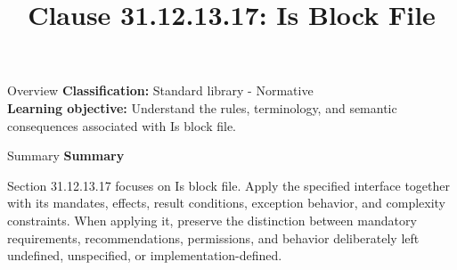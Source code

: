 \documentclass[10pt,letterpaper]{article}
\title{Clause 31.12.13.17: Is Block File}
\author{}
\date{}
\begin{document}
\maketitle
\begin{CornellOverviewBox}{Overview}
\textbf{Classification:} Standard library - Normative\\[2pt]
\textbf{Learning objective:} Understand the rules, terminology, and semantic consequences associated with Is block file.
\end{CornellOverviewBox}\begin{CornellSummaryBox}{Summary}
{\sffamily\bfseries\color{Accent} Summary}\par\vspace{3pt}Section 31.12.13.17 focuses on Is block file. Apply the specified interface together with its mandates, effects, result conditions, exception behavior, and complexity constraints. When applying it, preserve the distinction between mandatory requirements, recommendations, permissions, and behavior deliberately left undefined, unspecified, or implementation-defined.
\end{CornellSummaryBox}
\end{document}

